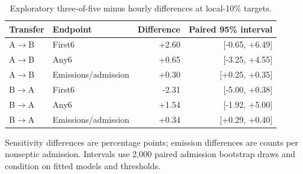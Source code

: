 \begin{table}[htbp]
\centering
\small
\setlength{\tabcolsep}{4pt}
\renewcommand{\arraystretch}{1.18}
\caption{Exploratory three-of-five minus hourly differences at local-10\% targets.}\label{tab:spair}
\begin{tabular}{llrr}
\toprule
Transfer & Endpoint & Difference & Paired 95\% interval \\
\midrule
A$\to$B & First6 & +2.60 & [-0.65, +6.49] \\
A$\to$B & Any6 & +0.65 & [-3.25, +4.55] \\
A$\to$B & Emissions/admission & +0.30 & [+0.25, +0.35] \\
B$\to$A & First6 & -2.31 & [-5.00, +0.38] \\
B$\to$A & Any6 & +1.54 & [-1.92, +5.00] \\
B$\to$A & Emissions/admission & +0.34 & [+0.29, +0.40] \\
\bottomrule
\end{tabular}
\par\vspace{3pt}\begin{minipage}{\linewidth}\footnotesize Sensitivity differences are percentage points; emission differences are counts per nonseptic admission. Intervals use 2,000 paired admission bootstrap draws and condition on fitted models and thresholds.\end{minipage}
\end{table}
